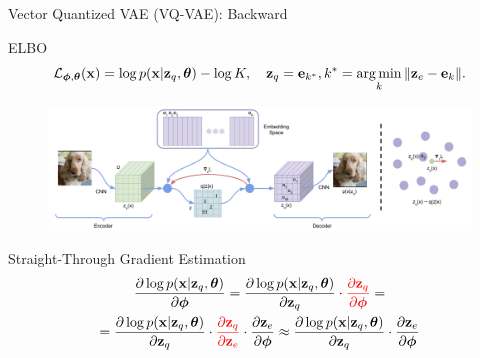 \documentclass{beamer}
\begin{document}
\begin{frame}{Vector Quantized VAE (VQ-VAE): Backward}
	\begin{block}{ELBO}
		\vspace{-0.5cm}
		\[
			\mathcal{L}_{\boldsymbol{\phi}, \boldsymbol{\theta}}(\mathbf{x})  =  \log p(\mathbf{x} | \mathbf{z}_q, \boldsymbol{\theta}) - \log K, \quad \mathbf{z}_q = \mathbf{e}_{k^*}, k^* = \operatorname*{arg\,min}_k \| \mathbf{z}_e - \mathbf{e}_k \|.
		\]
		\vspace{-0.5cm}
	\end{block}
	\begin{figure}
		\centering
		\includegraphics[width=0.85\linewidth]{figs/vqvae}
	\end{figure}
	\vspace{-0.3cm}
	\begin{block}{Straight-Through Gradient Estimation}
		\vspace{-0.5cm}
		\begin{multline*}
		\frac{\partial \log p(\mathbf{x} | \mathbf{z}_q , \boldsymbol{\theta})}{\partial \boldsymbol{\phi}} = \frac{\partial \log p(\mathbf{x} | \mathbf{z}_q, \boldsymbol{\theta})}{\partial \mathbf{z}_q} \cdot {\color{red}\frac{\partial \mathbf{z}_q}{\partial \boldsymbol{\phi}}} = \\
		= \frac{\partial \log p(\mathbf{x} | \mathbf{z}_q, \boldsymbol{\theta})}{\partial \mathbf{z}_q} \cdot {\color{red}\frac{\partial \mathbf{z}_q}{\partial \mathbf{z}_e}} \cdot \frac{\partial \mathbf{z}_e}{\partial \boldsymbol{\phi}} \approx \frac{\partial \log p(\mathbf{x} | \mathbf{z}_q, \boldsymbol{\theta})}{\partial \mathbf{z}_q} \cdot \frac{\partial \mathbf{z}_e}{\partial \boldsymbol{\phi}}
		\end{multline*}
	\end{block}
\end{frame}
\end{document}
